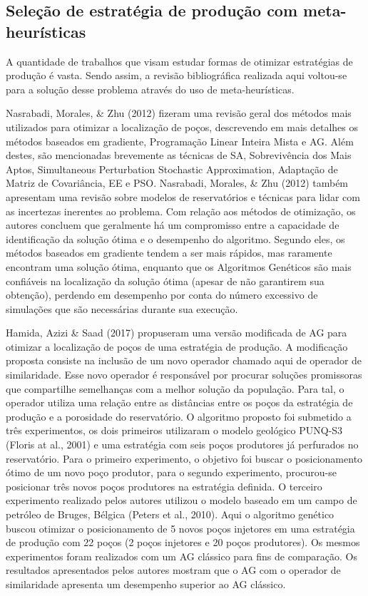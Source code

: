 \subsection{Seleção de estratégia de produção com meta-heurísticas}

A quantidade de trabalhos que visam estudar formas de otimizar estratégias de produção é vasta. Sendo assim, a revisão bibliográfica realizada aqui voltou-se para a solução desse problema através do uso de meta-heurísticas.

Nasrabadi, Morales, \& Zhu (2012) fizeram uma revisão geral dos métodos mais utilizados para otimizar a localização de poços, descrevendo em mais detalhes os métodos baseados em gradiente, Programação Linear Inteira Mista e AG. Além destes, são mencionadas brevemente as técnicas de SA, Sobrevivência dos Mais Aptos, Simultaneous Perturbation Stochastic Approximation, Adaptação de Matriz de Covariância, EE e PSO. Nasrabadi, Morales, \& Zhu (2012) também apresentam uma revisão sobre modelos de reservatórios e técnicas para lidar com as incertezas inerentes ao problema. Com relação aos métodos de otimização, os autores concluem que geralmente há um compromisso entre a capacidade de identificação da solução ótima e o desempenho do algoritmo. Segundo eles, os métodos baseados em gradiente tendem a ser mais rápidos, mas raramente encontram uma solução ótima, enquanto que os Algoritmos Genéticos são mais confiáveis na localização da solução ótima (apesar de não garantirem sua obtenção), perdendo em desempenho por conta do número excessivo de simulações que são necessárias durante sua execução.

Hamida, Azizi \& Saad (2017) propuseram uma versão modificada de AG para otimizar a localização de poços de uma estratégia de produção. A modificação proposta consiste na inclusão de um novo operador chamado aqui de operador de similaridade. Esse novo operador é responsável por procurar soluções promissoras que compartilhe semelhanças com a melhor solução da população. Para tal, o operador utiliza uma relação entre as distâncias entre os poços da estratégia de produção e a porosidade do reservatório. O algoritmo proposto foi submetido a três experimentos, os dois primeiros utilizaram o modelo geológico PUNQ-S3 (Floris at al., 2001) e uma estratégia com seis poços produtores já perfurados no reservatório. Para o primeiro experimento, o objetivo foi buscar o posicionamento ótimo de um novo poço produtor, para o segundo experimento, procurou-se posicionar três novos poços produtores na estratégia definida. O terceiro experimento realizado pelos autores utilizou o modelo baseado em um campo de petróleo de Bruges, Bélgica (Peters et al., 2010). Aqui o algoritmo genético buscou otimizar o posicionamento de 5 novos poços injetores em uma estratégia de produção com 22 poços (2 poços injetores e 20 poços produtores). Os mesmos experimentos foram realizados com um AG clássico para fins de comparação. Os resultados apresentados pelos autores mostram que o AG com o operador de similaridade apresenta um desempenho superior ao AG clássico.


